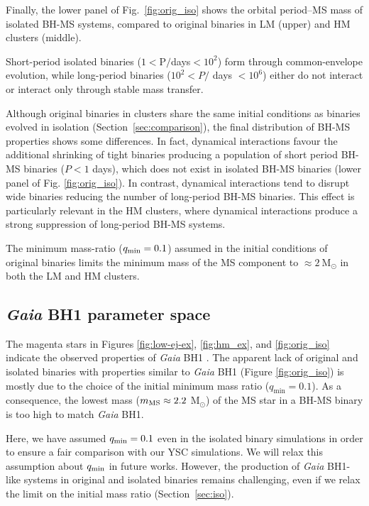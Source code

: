 \documentclass[fleqn,usenatbib]{mnras}
\newcommand{\Ms}{M$_\odot$}
\newcommand{\bh}{\textit{Gaia} BH1}
\begin{document}
Finally, the lower panel of Fig.~\ref{fig:orig_iso} shows the orbital period--MS mass of isolated BH-MS systems, compared to original binaries in LM (upper) and HM clusters (middle).

Short-period isolated binaries ($1< \mathrm{P}/$days$<10^{2}$) form through common-envelope evolution, while long-period binaries ($10^{2}< P/$ days $<10^{6}$) either do not interact or interact only through stable mass transfer.  


Although original binaries in clusters share the same initial conditions as 
binaries evolved in isolation (Section~\ref{sec:comparison}), the final distribution of BH-MS properties shows some differences. In fact, dynamical interactions
favour the additional shrinking of tight binaries producing a population of  short period BH-MS binaries ($P<1$ days), 
which does not exist in isolated BH-MS binaries (lower panel of Fig. \ref{fig:orig_iso}). 
In contrast, dynamical interactions tend to disrupt wide binaries reducing the number of long-period BH-MS binaries. This effect is particularly relevant in the HM clusters, where  
dynamical interactions produce a strong suppression of 
long-period BH-MS systems.

The minimum mass-ratio ($q_{\rm{min}}=0.1$) assumed  
in the initial conditions of original binaries  limits the minimum mass of the MS component to $\approx 2 \ \mathrm{M}_\odot$ in both the LM and HM clusters.



\subsection{\bh{} parameter space} \label{sec:intbh}

The magenta stars in Figures \ref{fig:low-ej-ex}, \ref{fig:hm_ex}, and \ref{fig:orig_iso} indicate the observed properties of \bh{} \citep{elbadry2023a}.
The apparent lack of original and isolated binaries with properties similar to \bh{} (Figure \ref{fig:orig_iso}) is mostly due to the choice of the initial minimum mass ratio ($q_\mathrm{min}=0.1$).  
As a consequence, the lowest mass ($m_{\rm{MS}}\approx 2.2 $ \Ms) of the MS star in a BH-MS binary is too high to match \bh. 

Here, we have assumed $q_{\rm min}=0.1$ even in the isolated binary simulations in order to ensure a fair comparison with our YSC simulations. We will relax this assumption about $q_{\rm min}$ in future works.
However, the production of \bh{}-like systems in original and isolated binaries remains challenging, even if we  relax the limit on the initial mass ratio  (Section~\ref{sec:iso}).
\end{document}
